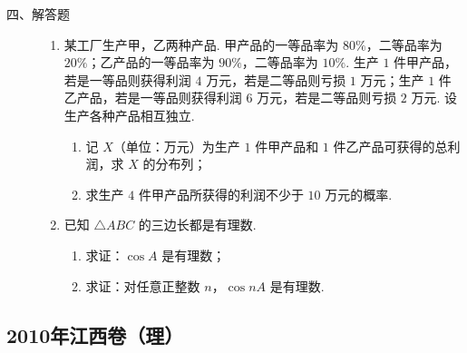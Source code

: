 \begin{description}

    \item[四、解答题]

    \begin{enumerate}[leftmargin=5pt]

      \addtocounter{enumi}{+24}

        \item 某工厂生产甲，乙两种产品. 甲产品的一等品率为 \(80\%\)，二等品率为 \(20\%\)；乙产品的一等品率为 \(90\%\)，二等品率为 \(10\%\). 生产 \(1\) 件甲产品，若是一等品则获得利润 \(4\) 万元，若是二等品则亏损 \(1\) 万元；生产 \(1\) 件乙产品，若是一等品则获得利润 \(6\) 万元，若是二等品则亏损 \(2\) 万元. 设生产各种产品相互独立.

\begin{enumerate}
\item 记 \(X\)（单位：万元）为生产 \(1\) 件甲产品和 \(1\) 件乙产品可获得的总利润，求 \(X\) 的分布列；
\item 求生产 \(4\) 件甲产品所获得的利润不少于 \(10\) 万元的概率.
\end{enumerate}

        \item 已知 \(\triangle ABC\) 的三边长都是有理数.

\begin{enumerate}
\item 求证：\(\cos A\) 是有理数；
\item 求证：对任意正整数 \(n\)，\(\cos nA\) 是有理数.
\end{enumerate}

    \end{enumerate}

\end{description}


\subsection{2010年江西卷（理）}\label{gk:2010年江西卷（理）}

